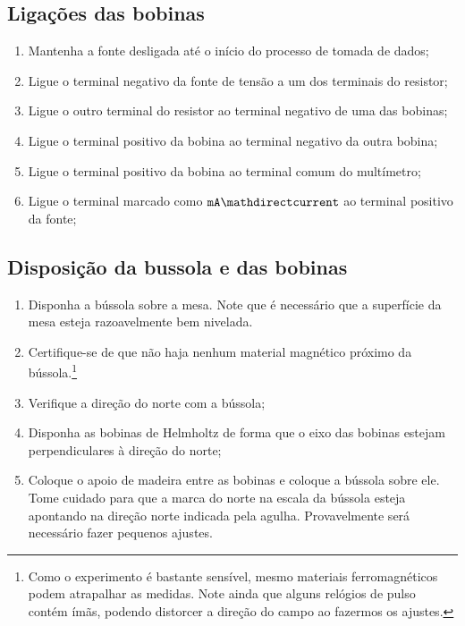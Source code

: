 \subsection{Ligações das bobinas} %

\begin{enumerate}
    \item Mantenha a fonte desligada até o início do processo de tomada de dados;
	\item Ligue o terminal negativo da fonte de tensão a um dos terminais do resistor;
	\item Ligue o outro terminal do resistor ao terminal negativo de uma das bobinas;
	\item Ligue o terminal positivo da bobina ao terminal negativo da outra bobina;
	\item Ligue o terminal positivo da bobina ao terminal comum do multímetro;
	\item Ligue o terminal marcado como $\texttt{mA}\mathdirectcurrent$ ao terminal positivo da fonte;
\end{enumerate}

\subsection{Disposição da bussola e das bobinas}

\begin{enumerate}
	\item Disponha a bússola sobre a mesa. Note que é necessário que a superfície da mesa esteja razoavelmente bem nivelada.
	\item Certifique-se de que não haja nenhum material magnético próximo da bússola.\footnote{Como o experimento é bastante sensível, mesmo materiais ferromagnéticos podem atrapalhar as medidas. Note ainda que alguns relógios de pulso contém ímãs, podendo distorcer a direção do campo ao fazermos os ajustes.}
	\item Verifique a direção do norte com a bússola;
	\item Disponha as bobinas de Helmholtz de forma que o eixo das bobinas estejam perpendiculares à direção do norte;
	\item Coloque o apoio de madeira entre as bobinas e coloque a bússola sobre ele. Tome cuidado para que a marca do norte na escala da bússola esteja apontando na direção norte indicada pela agulha. Provavelmente será necessário fazer pequenos ajustes.
\end{enumerate}

